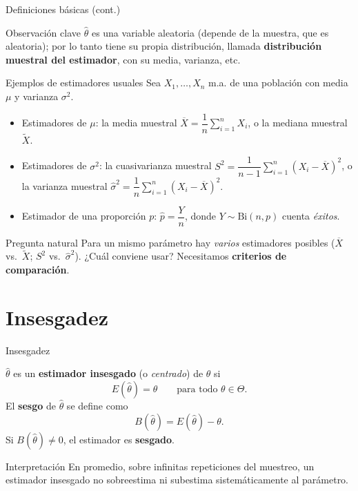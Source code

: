 \documentclass[aspectratio=169,11pt]{beamer}
\begin{document}
\begin{frame}{Definiciones básicas (cont.)}
\begin{block}{Observación clave}
$\widehat{\theta}$ es una variable aleatoria (depende de la muestra, que es aleatoria); por lo tanto tiene su propia distribución, llamada \textbf{distribución muestral del estimador}, con su media, varianza, etc.
\end{block}
\end{frame}

\begin{frame}{Ejemplos de estimadores usuales}
Sea $X_1,\dots,X_n$ m.a. de una población con media $\mu$ y varianza $\sigma^2$.

\begin{itemize}
\item Estimadores de $\mu$: la media muestral $\overline{X} = \dfrac{1}{n}\sum_{i=1}^n X_i$, o la mediana muestral $\widetilde{X}$.
\item Estimadores de $\sigma^2$: la cuasivarianza muestral $S^2 = \dfrac{1}{n-1}\sum_{i=1}^n (X_i - \overline{X})^2$, o la varianza muestral $\widehat{\sigma}^2 = \dfrac{1}{n}\sum_{i=1}^n (X_i - \overline{X})^2$.
\item Estimador de una proporción $p$: $\widehat{p} = \dfrac{Y}{n}$, donde $Y\sim \text{Bi}(n,p)$ cuenta \emph{éxitos}.
\end{itemize}

\begin{alertblock}{Pregunta natural}
Para un mismo parámetro hay \emph{varios} estimadores posibles ($\overline{X}$ vs.\ $\widetilde{X}$; $S^2$ vs.\ $\widehat\sigma^2$). ¿Cuál conviene usar? Necesitamos \textbf{criterios de comparación}.
\end{alertblock}
\end{frame}

\section{Insesgadez}

\begin{frame}{Insesgadez}
\begin{definition}
$\widehat{\theta}$ es un \textbf{estimador insesgado} (o \emph{centrado}) de $\theta$ si
\[
E(\widehat{\theta}) = \theta \qquad \text{para todo } \theta \in \Theta.
\]
El \textbf{sesgo} de $\widehat\theta$ se define como
\[
B(\widehat\theta) = E(\widehat\theta) - \theta.
\]
Si $B(\widehat\theta) \neq 0$, el estimador es \textbf{sesgado}.
\end{definition}

\begin{block}{Interpretación}
En promedio, sobre infinitas repeticiones del muestreo, un estimador insesgado no sobreestima ni subestima sistemáticamente al parámetro.
\end{block}
\end{frame}
\end{document}
